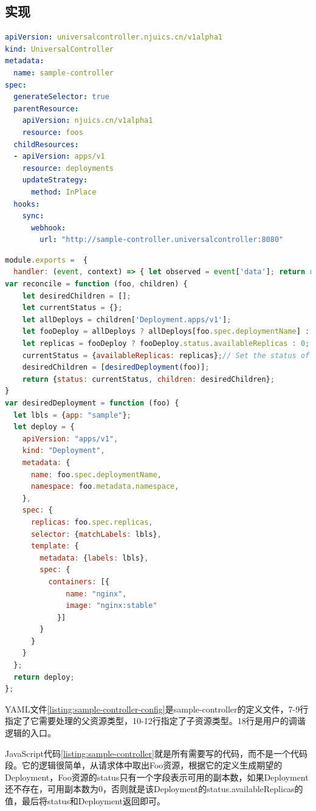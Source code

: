 \documentclass[macfonts,master]{njuthesis}
\begin{document}
\subsection{实现}

\begin{lstlisting}[language=yaml,caption=sample-controller的配置文件,label=listing:sample-controller-config]
apiVersion: universalcontroller.njuics.cn/v1alpha1
kind: UniversalController
metadata:
  name: sample-controller
spec:
  generateSelector: true
  parentResource:
    apiVersion: njuics.cn/v1alpha1
    resource: foos
  childResources:
  - apiVersion: apps/v1
    resource: deployments
    updateStrategy:
      method: InPlace
  hooks:
    sync:
      webhook:
        url: "http://sample-controller.universalcontroller:8080"
\end{lstlisting}


\begin{lstlisting}[language=JavaScript,caption=sample-controller的实现代码,label=listing:sample-controller]
module.exports =  {
  handler: (event, context) => { let observed = event['data']; return reconcile(observed.parent, observed.children);} };
var reconcile = function (foo, children) {
    let desiredChildren = [];
    let currentStatus = {};
    let allDeploys = children['Deployment.apps/v1'];
    let fooDeploy = allDeploys ? allDeploys[foo.spec.deploymentName] : null;
    let replicas = fooDeploy ? fooDeploy.status.availableReplicas : 0;
    currentStatus = {availableReplicas: replicas};// Set the status of Foo
    desiredChildren = [desiredDeployment(foo)];
    return {status: currentStatus, children: desiredChildren};
}
var desiredDeployment = function (foo) {
  let lbls = {app: "sample"};
  let deploy = {
    apiVersion: "apps/v1",
    kind: "Deployment",
    metadata: {
      name: foo.spec.deploymentName,
      namespace: foo.metadata.namespace,
    },
    spec: {
      replicas: foo.spec.replicas,
      selector: {matchLabels: lbls},
      template: {
        metadata: {labels: lbls},
        spec: {
          containers: [{
              name: "nginx",
              image: "nginx:stable"
            }]
        }
      }
    }
  };
  return deploy;
};
\end{lstlisting}

YAML文件\ref{listing:sample-controller-config}是sample-controller的定义文件，7-9行指定了它需要处理的父资源类型，10-12行指定了子资源类型。18行是用户的调谐逻辑的入口。

JavaScript代码\ref{listing:sample-controller}就是所有需要写的代码，而不是一个代码段。它的逻辑很简单，从请求体中取出Foo资源，根据它的定义生成期望的Deployment，Foo资源的status只有一个字段表示可用的副本数，如果Deployment还不存在，可用副本数为0，否则就是该Deployment的status.availableReplicas的值，最后将status和Deployment返回即可。
\end{document}
